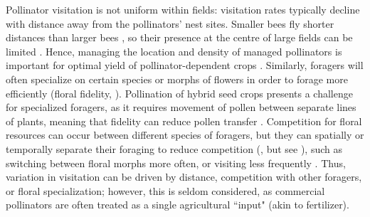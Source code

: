 \documentclass[12pt]{article} %
\begin{document}
Pollinator visitation is not uniform within fields: visitation rates typically decline with distance away from the pollinators' nest sites.
Smaller bees fly shorter distances than larger bees \citep{greenleaf2007,zurbuchen2010}, so their presence at the centre of large fields can be limited \citep{isaacs2010}. 
Hence, managing the location and density of managed pollinators is important for optimal yield of pollinator-dependent crops \citep{fries1983,cresswell2004b}.
Similarly, foragers will often specialize on certain species or morphs of flowers in order to forage more efficiently (floral fidelity, \citealp{heinrich1976b, goulson1997}). 
Pollination of hybrid seed crops presents a challenge for specialized foragers, as it requires movement of pollen between separate lines of plants, meaning that fidelity can reduce pollen transfer \citep{waytesMsc, gaffney2019}.
Competition for floral resources can occur between different species of foragers, but they can spatially or temporally separate their foraging to reduce competition (\citealp{schaffer1979,thomson1987}, but see \citealp{steffan2000}), such as switching between floral morphs more often, or visiting less frequently \citep{heinrich1979, greenleaf2006}.
Thus, variation in visitation can be driven by distance, competition with other foragers, or floral specialization; however, this is seldom considered, as commercial pollinators are often treated as a single agricultural ``input" (akin to fertilizer).
\end{document}

